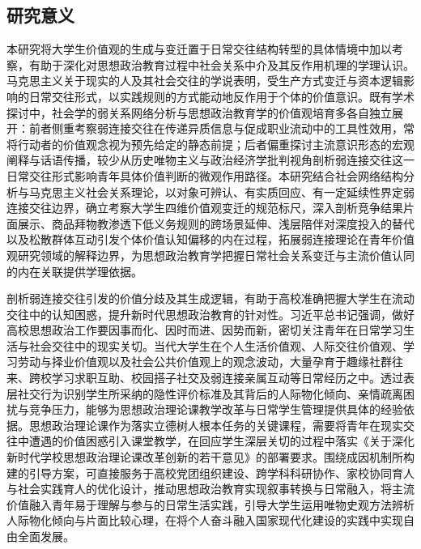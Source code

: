 \subsection{研究意义}

本研究将大学生价值观的生成与变迁置于日常交往结构转型的具体情境中加以考察，有助于深化对思想政治教育过程中社会关系中介及其反作用机理的学理认识。马克思主义关于现实的人及其社会交往的学说表明，受生产方式变迁与资本逻辑影响的日常交往形式，以实践规则的方式能动地反作用于个体的价值意识。既有学术探讨中，社会学的弱关系网络分析与思想政治教育学的价值观培育多各自独立展开：前者侧重考察弱连接交往在传递异质信息与促成职业流动中的工具性效用，常将行动者的价值观念视为预先给定的静态前提；后者偏重探讨主流意识形态的宏观阐释与话语传播，较少从历史唯物主义与政治经济学批判视角剖析弱连接交往这一日常交往形式影响青年具体价值判断的微观作用路径。本研究结合社会网络结构分析与马克思主义社会关系理论，以对象可辨认、有实质回应、有一定延续性界定弱连接交往边界，确立考察大学生四维价值观变迁的规范标尺，深入剖析竞争结果片面展示、商品拜物教渗透下低义务规则的跨场景延伸、浅层陪伴对深度投入的替代以及松散群体互动引发个体价值认知偏移的内在过程，拓展弱连接理论在青年价值观研究领域的解释边界，为思想政治教育学把握日常社会关系变迁与主流价值认同的内在关联提供学理依据。

剖析弱连接交往引发的价值分歧及其生成逻辑，有助于高校准确把握大学生在流动交往中的认知困惑，提升新时代思想政治教育的针对性。习近平总书记强调，做好高校思想政治工作要因事而化、因时而进、因势而新，密切关注青年在日常学习生活与社会交往中的现实关切\cite{Xi2022}。当代大学生在个人生活价值观、人际交往价值观、学习劳动与择业价值观以及社会公共价值观上的观念波动，大量孕育于趣缘社群往来、跨校学习求职互助、校园搭子社交及弱连接亲属互动等日常经历之中。透过表层社交行为识别学生所采纳的隐性评价标准及其背后的人际物化倾向、亲情疏离困扰与竞争压力，能够为思想政治理论课教学改革与日常学生管理提供具体的经验依据。思想政治理论课作为落实立德树人根本任务的关键课程\cite{Xi2020}，需要将青年在现实交往中遭遇的价值困惑引入课堂教学，在回应学生深层关切的过程中落实《关于深化新时代学校思想政治理论课改革创新的若干意见》的部署要求\cite{CPCC2019_Yijian}。围绕成因机制所构建的引导方案，可直接服务于高校党团组织建设、跨学科科研协作、家校协同育人与社会实践育人的优化设计，推动思想政治教育实现叙事转换与日常融入，将主流价值融入青年易于理解与参与的日常生活实践\cite{Shen2021_narrative}，引导大学生运用唯物史观方法辨析人际物化倾向与片面比较心理，在将个人奋斗融入国家现代化建设的实践中实现自由全面发展。